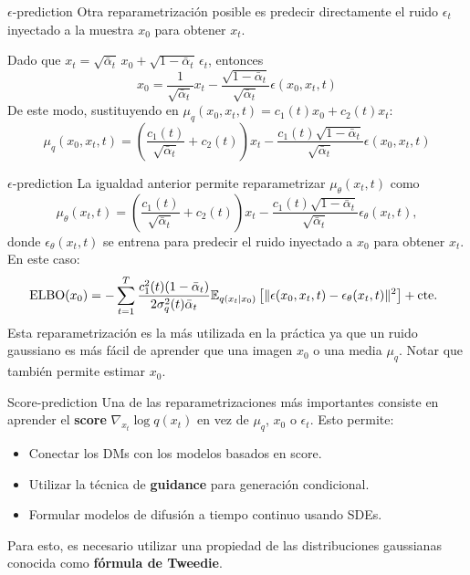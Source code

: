 \documentclass{beamer}
\begin{document}
\begin{frame}{$\epsilon$-prediction}
    Otra reparametrización posible es predecir directamente el ruido $\epsilon_t$ inyectado a la muestra $x_0$ para obtener $x_t$.

    Dado que $x_t=\sqrt{\bar\alpha_t}\,x_0+\sqrt{1-\bar\alpha_t}\,\epsilon_t$, entonces
    \begin{equation*}
        x_0=\frac{1}{\sqrt{\bar\alpha_t}}x_t-\frac{\sqrt{1-\bar\alpha_t}}{\sqrt{\bar\alpha_t}}\epsilon(x_0,x_t,t)
    \end{equation*}
    De este modo, sustituyendo en $\mu_q(x_0,x_t,t)=c_1(t)x_0+c_2(t)x_t$:
    \begin{equation*}
        \mu_q(x_0,x_t,t)=\left(\frac{c_1(t)}{\sqrt{\bar\alpha_t}}+c_2(t)\right)x_t- \frac{c_1(t)\sqrt{1-\bar\alpha_t}}{\sqrt{\bar\alpha_t}}\epsilon(x_0,x_t,t)
    \end{equation*}
\end{frame}

\begin{frame}{$\epsilon$-prediction}
    La igualdad anterior permite reparametrizar $\mu_\theta(x_t,t)$ como
    \begin{equation*}
        \mu_\theta(x_t,t)=\left(\frac{c_1(t)}{\sqrt{\bar\alpha_t}}+c_2(t)\right)x_t- \frac{c_1(t)\sqrt{1-\bar\alpha_t}}{\sqrt{\bar\alpha_t}}\epsilon_\theta(x_t,t),
    \end{equation*}
    donde $\epsilon_\theta(x_t,t)$ se entrena para predecir el ruido inyectado a $x_0$ para obtener $x_t$. En este caso:
    \begin{equation*}
        \hspace{-0.2cm}
        \operatorname{ELBO}(x_0) = - \sum_{t=1}^T \frac{c_1^2(t)(1-\bar\alpha_t)}{2\sigma_q^2(t)\bar\alpha_t}\mathbb{E}_{q(x_t|x_0)}\left[\|\epsilon(x_0,x_t,t)-\epsilon_\theta(x_t,t)\|^2\right]+\text{cte.}
    \end{equation*}
    Esta reparametrización es la más utilizada en la práctica ya que un ruido gaussiano es más fácil de aprender que una imagen $x_0$ o una media $\mu_q$. Notar que también permite estimar $x_0$.
\end{frame}

\begin{frame}{Score-prediction}
    Una de las reparametrizaciones más importantes consiste en aprender el \textbf{score} $\nabla_{x_t}\log q(x_t)$ en vez de $\mu_q$, $x_0$ o $\epsilon_t$. Esto permite:
    \begin{itemize}
        \item Conectar los DMs con los modelos basados en score.
        \item Utilizar la técnica de \textbf{guidance} para generación condicional.
        \item Formular modelos de difusión a tiempo continuo usando SDEs.
    \end{itemize}
    Para esto, es necesario utilizar una propiedad de las distribuciones gaussianas conocida como \textbf{fórmula de Tweedie}.
\end{frame}
\end{document}
